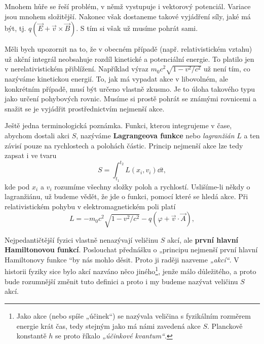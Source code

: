     Mnohem hůře se řeší problém, v němž vystupuje i vektorový potenciál. Variace jsou mnohem
    složitější. Nakonec však dostaneme takové vyjádření síly, jaké má být, tj. \(q(\vec{E} +
    \vec{v}\times \vec{B})\). S tím si však už musíme pohrát sami.

    Měli bych upozornit na to, že v obecném případě (např. relativistickém vztahu) už akční
    integrál neobsahuje rozdíl kinetické a potenciální energie. To platilo jen v nerelativistickém
    přiblížení. Například výraz \(m_0c^2\sqrt{1- v^2/c^2}\) už není tím, co nazýváme kinetickou
    energií. To, jak má vypadat akce v libovolném, ale konkrétním případě, musí být určeno vlastně
    zkusmo. Je to úloha takového typu jako určení pohybových rovnic. Musíme si prostě pohrát se
    známými rovnicemi a snažit se je vyjádřit prostřednictvím nejmenší akce.

    Ještě jedna terminologická poznámka. Funkci, kterou integrujeme v čase, abychom dostali akci
    \(S\), nazýváme \textbf{Lagrangeova funkce} nebo \emph{lagranžián} \(L\) a ten závisí pouze na
    rychlostech a polohách částic. Princip nejmenší akce lze tedy zapsat i ve tvaru
    \begin{equation*}
      S = \int_{t_1}^{t_2}L(x_i,v_i)\dd{t},
    \end{equation*}
    kde pod \(x_i\) a \(v_i\) rozumíme všechny složky poloh a rychlostí. Uslišíme-li někdy o
    lagranžiánu, už budeme vědět, že jde o funkci, pomocí které se hledá akce. Při relativistickém
    pohybu v elektromagnetickém poli platí
    \begin{equation*}
      L = - m_0c^2\sqrt{1 - {v^2}/{c^2}} - q(\varphi + \vec{v}\cdot\vec{A}),
    \end{equation*}

    Nejpedantičtější fyzici vlastně nenazývají veličinu \(S\) akcí, ale \textbf{první hlavní
    Hamiltonovou funkcí}. Poslouchat přednášku o „principu nejmenší první hlavní Hamiltonovy funkce
    “by nás mohlo děsit. Proto ji raději nazveme \emph{„akcí“}. V historii fyziky sice bylo akcí
    nazváno něco jiného\footnote{Jako akce (nebo spíše „účinek“) se nazývala veličina s fyzikálním
    rozměrem energie krát čas, tedy stejným jako má námi zavedená akce \(S\). Planckově konstantě
    \(h\) se proto říkalo \emph{„účinkové kvantum“}.}, jenže málo důležitého, a proto bude
    rozumnější změnit tuto definici a proto i my budeme nazývat veličinu \(S\) akcí.


